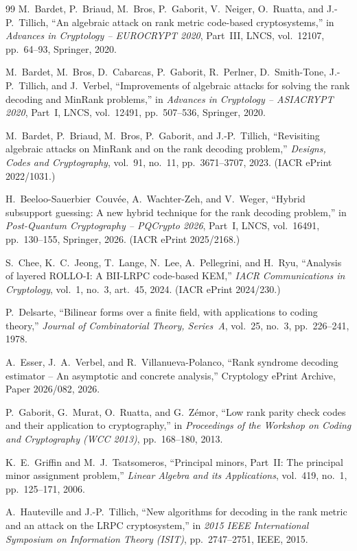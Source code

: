 \documentclass[11pt,a4paper]{article}
\theoremstyle{definition}
\theoremstyle{remark}
\begin{document}
\begin{thebibliography}{99}
M.~Bardet, P.~Briaud, M.~Bros, P.~Gaborit, V.~Neiger, O.~Ruatta, and J.-P.~Tillich,
``An algebraic attack on rank metric code-based cryptosystems,'' in \emph{Advances in Cryptology -- EUROCRYPT 2020}, Part~III, LNCS, vol.~12107, pp.~64--93, Springer, 2020.

M.~Bardet, M.~Bros, D.~Cabarcas, P.~Gaborit, R.~Perlner, D.~Smith-Tone, J.-P.~Tillich, and J.~Verbel,
``Improvements of algebraic attacks for solving the rank decoding and MinRank problems,'' in \emph{Advances in Cryptology -- ASIACRYPT 2020}, Part~I, LNCS, vol.~12491, pp.~507--536, Springer, 2020.

M.~Bardet, P.~Briaud, M.~Bros, P.~Gaborit, and J.-P.~Tillich,
``Revisiting algebraic attacks on MinRank and on the rank decoding problem,'' \emph{Designs, Codes and Cryptography}, vol.~91, no.~11, pp.~3671--3707, 2023. (IACR ePrint 2022/1031.)

H.~Beeloo-Sauerbier~Couv\'{e}e, A.~Wachter-Zeh, and V.~Weger,
``Hybrid subsupport guessing: A new hybrid technique for the rank decoding problem,'' in \emph{Post-Quantum Cryptography -- PQCrypto 2026}, Part~I, LNCS, vol.~16491, pp.~130--155, Springer, 2026. (IACR ePrint 2025/2168.)

S.~Chee, K.~C.~Jeong, T.~Lange, N.~Lee, A.~Pellegrini, and H.~Ryu,
``Analysis of layered ROLLO-I: A BII-LRPC code-based KEM,'' \emph{IACR Communications in Cryptology}, vol.~1, no.~3, art.~45, 2024. (IACR ePrint 2024/230.)

P.~Delsarte,
``Bilinear forms over a finite field, with applications to coding theory,'' \emph{Journal of Combinatorial Theory, Series~A}, vol.~25, no.~3, pp.~226--241, 1978.

A.~Esser, J.~A.~Verbel, and R.~Villanueva-Polanco,
``Rank syndrome decoding estimator -- An asymptotic and concrete analysis,'' Cryptology ePrint Archive, Paper 2026/082, 2026.

P.~Gaborit, G.~Murat, O.~Ruatta, and G.~Z\'{e}mor,
``Low rank parity check codes and their application to cryptography,'' in \emph{Proceedings of the Workshop on Coding and Cryptography (WCC 2013)}, pp.~168--180, 2013.

K.~E.~Griffin and M.~J.~Tsatsomeros,
``Principal minors, Part~II: The principal minor assignment problem,'' \emph{Linear Algebra and its Applications}, vol.~419, no.~1, pp.~125--171, 2006.

A.~Hauteville and J.-P.~Tillich,
``New algorithms for decoding in the rank metric and an attack on the LRPC cryptosystem,'' in \emph{2015 IEEE International Symposium on Information Theory (ISIT)}, pp.~2747--2751, IEEE, 2015.


\end{thebibliography}
\end{document}
